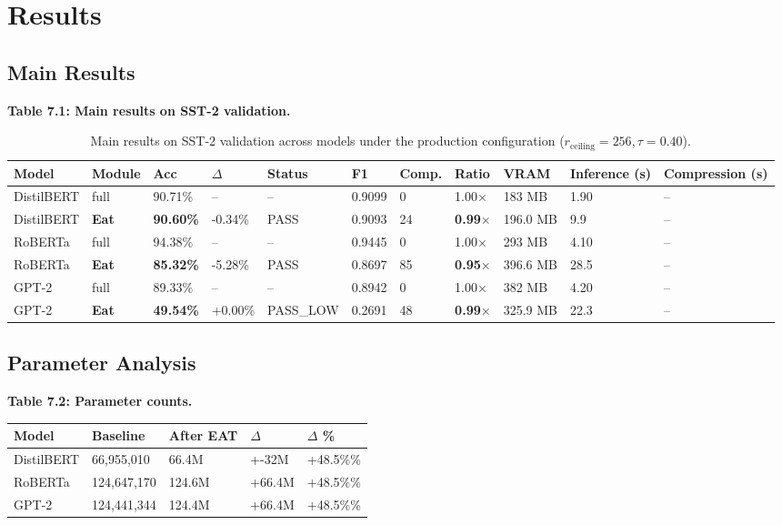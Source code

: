 
\section{Results}

\subsection{Main Results}

\textbf{Table 7.1: Main results on SST-2 validation.}

\begin{table}[t]
\centering
\small
\begin{tabular}{lllllllllll}
\toprule
\textbf{Model} & \textbf{Module} & \textbf{Acc} & \textbf{$\Delta$} & \textbf{Status} & \textbf{F1} & \textbf{Comp.} & \textbf{Ratio} & \textbf{VRAM} & \textbf{Inference (s)} & \textbf{Compression (s)} \\
\midrule
DistilBERT & full & 90.71\% & -- & -- & 0.9099 & 0 & 1.00$\times$ & 183 MB & 1.90 & -- \\
DistilBERT & \textbf{Eat} & \textbf{90.60\%} & -0.34\% & PASS & 0.9093 & 24 & \textbf{0.99$\times$} & 196.0 MB & 9.9 & -- \\
RoBERTa & full & 94.38\% & -- & -- & 0.9445 & 0 & 1.00$\times$ & 293 MB & 4.10 & -- \\
RoBERTa & \textbf{Eat} & \textbf{85.32\%} & -5.28\% & PASS & 0.8697 & 85 & \textbf{0.95$\times$} & 396.6 MB & 28.5 & -- \\
GPT-2 & full & 89.33\% & -- & -- & 0.8942 & 0 & 1.00$\times$ & 382 MB & 4.20 & -- \\
GPT-2 & \textbf{Eat} & \textbf{49.54\%} & +0.00\% & PASS_LOW & 0.2691 & 48 & \textbf{0.99$\times$} & 325.9 MB & 22.3 & -- \\
\bottomrule
\end{tabular}
\caption{Main results on SST-2 validation across models under the production configuration ($r_{\mathrm{ceiling}}=256, \tau=0.40$).}
\label{tab:main_sst2}
\end{table}

\subsection{Parameter Analysis}

\textbf{Table 7.2: Parameter counts.}

\begin{table}[H]
\centering
\small
\begin{tabular}{lllll}
\toprule
\textbf{Model} & \textbf{Baseline} & \textbf{After EAT} & \textbf{$\Delta$} & \textbf{$\Delta$ \%} \\
\midrule
DistilBERT & 66,955,010 & 66.4M & +-32M & +48.5\%\% \\
RoBERTa & 124,647,170 & 124.6M & +66.4M & +48.5\%\% \\
GPT-2 & 124,441,344 & 124.4M & +66.4M & +48.5\%\% \\
\bottomrule
\end{tabular}
\end{table}


